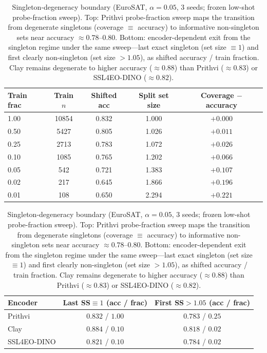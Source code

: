 \documentclass[preprint,11pt,authoryear]{elsarticle}
\begin{document}
\begin{table}[htbp]\centering\small
\caption{Singleton-degeneracy boundary (EuroSAT, $\alpha{=}0.05$, 3 seeds; frozen low-shot
probe-fraction sweep).
Top: Prithvi probe-fraction sweep maps the transition from degenerate singletons (coverage $\equiv$
accuracy) to informative non-singleton sets near accuracy $\approx0.78$--$0.80$. Bottom: encoder-dependent
exit from the singleton regime under the same sweep---last exact singleton (set size $\equiv1$) and first
clearly non-singleton (set size $>1.05$), as shifted accuracy / train fraction. Clay remains degenerate
to higher accuracy ($\approx0.88$) than Prithvi ($\approx0.83$) or SSL4EO-DINO
($\approx0.82$).}\label{tab:singleton}
\begin{tabular}{lcccc}
\toprule
Train frac & Train $n$ & Shifted acc & Split set size & Coverage $-$ accuracy \\
\midrule
1.00 & 10854 & 0.832 & 1.000 & $+0.000$ \\
0.50 & 5427  & 0.805 & 1.026 & $+0.011$ \\
0.25 & 2713  & 0.783 & 1.072 & $+0.026$ \\
0.10 & 1085  & 0.765 & 1.202 & $+0.066$ \\
0.05 & 542   & 0.721 & 1.383 & $+0.107$ \\
0.02 & 217   & 0.645 & 1.866 & $+0.196$ \\
0.01 & 108   & 0.650 & 2.294 & $+0.221$ \\
\bottomrule
\end{tabular}

\vspace{3pt}
\begin{tabular}{lcc}
\toprule
Encoder & Last SS$\equiv1$ (acc / frac) & First SS$>1.05$ (acc / frac) \\
\midrule
Prithvi & $0.832$ / $1.00$ & $0.783$ / $0.25$ \\
Clay & $0.884$ / $0.10$ & $0.818$ / $0.02$ \\
SSL4EO-DINO & $0.821$ / $0.10$ & $0.784$ / $0.02$ \\
\bottomrule
\end{tabular}
\end{table}
\end{document}

